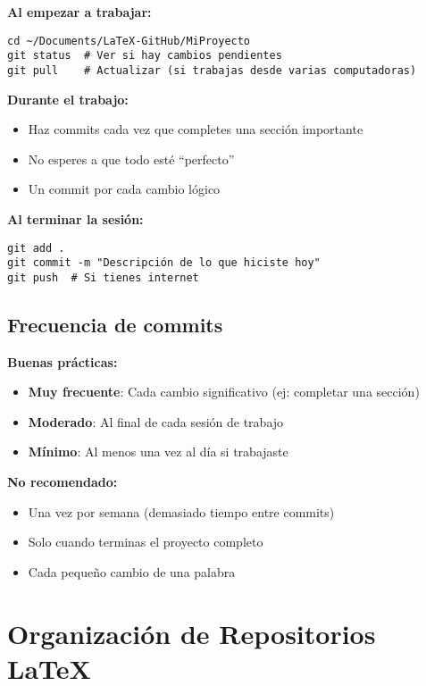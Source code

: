 \documentclass[11pt,a4paper]{article}
\begin{document}
\begin{successbox}
\textbf{Al empezar a trabajar:}
\begin{lstlisting}[style=bashstyle]
cd ~/Documents/LaTeX-GitHub/MiProyecto
git status  # Ver si hay cambios pendientes
git pull    # Actualizar (si trabajas desde varias computadoras)
\end{lstlisting}

\textbf{Durante el trabajo:}
\begin{itemize}
  \item Haz commits cada vez que completes una sección importante
  \item No esperes a que todo esté ``perfecto''
  \item Un commit por cada cambio lógico
\end{itemize}

\textbf{Al terminar la sesión:}
\begin{lstlisting}[style=bashstyle]
git add .
git commit -m "Descripción de lo que hiciste hoy"
git push  # Si tienes internet
\end{lstlisting}
\end{successbox}

\subsection{Frecuencia de commits}

\textbf{Buenas prácticas:}
\begin{itemize}
  \item \textbf{Muy frecuente}: Cada cambio significativo (ej: completar una sección)
  \item \textbf{Moderado}: Al final de cada sesión de trabajo
  \item \textbf{Mínimo}: Al menos una vez al día si trabajaste
\end{itemize}

\textbf{No recomendado:}
\begin{itemize}
  \item Una vez por semana (demasiado tiempo entre commits)
  \item Solo cuando terminas el proyecto completo
  \item Cada pequeño cambio de una palabra
\end{itemize}

\section{Organización de Repositorios LaTeX}
\end{document}
